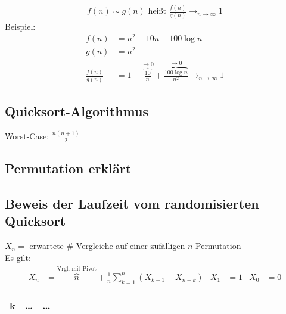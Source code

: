 \begin{align*}
    f(n) \sim g(n) \text{ heißt } \frac{f(n)}{g(n)} \rightarrow_{n \rightarrow \infty} 1
\end{align*}
Beispiel:
\begin{align*}
    f(n) &= n^2 - 10n + 100 \log n\\
    g(n) &= n^2\\
    \frac{f(n)}{g(n)} &= 1 - \overbrace{\frac{10}{n}}^{\rightarrow 0} + \overbrace{\frac{100 \log n}{n^2}}^{\rightarrow 0} \rightarrow_{n \rightarrow \infty} 1
\end{align*}


\subsection{Quicksort-Algorithmus}
Worst-Case: $\frac{n(n+1)}{2}$

\subsection{Permutation erklärt}
\begin{center}
\end{center}

\subsection{Beweis der Laufzeit vom randomisierten Quicksort}
$X_n =$ erwartete \# Vergleiche auf einer zufälligen $n$-Permutation\\
Es gilt:
\begin{align*}
    X_n &= \overbrace{n}^{\text{Vrgl. mit Pivot}} + \frac{1}{n} \sum_{k =1}^{n} (X_{k-1} + X_{n-k}) & X_1&=1 &X_0 &= 0
\end{align*}

\begin{tabular}{|c|cc|}
     \hline
     k & \dots & \dots\\\hline
\end{tabular}

